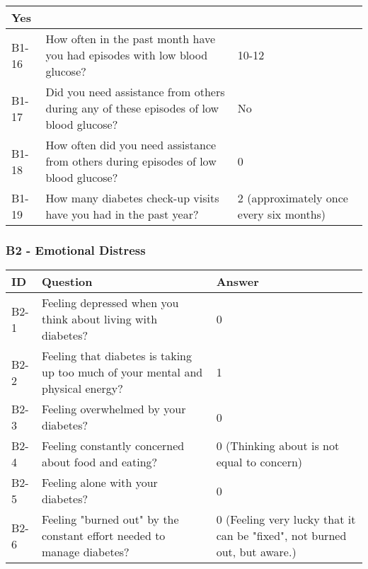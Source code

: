 \begin{table}[H]
\begin{tabularx}{\textwidth}{|l|X|l|}
        Yes  
        \\ \hline
        B1-16 & How often in the past month have you had episodes with low blood glucose? & 
        10-12 
        \\ \hline
        B1-17 & Did you need assistance from others during any of these episodes of low blood glucose? & 
        No  
        \\ \hline
        B1-18 & How often did you need assistance from others during episodes of low blood glucose? & 
        0 
        \\ \hline
        B1-19 & How many diabetes check-up visits have you had in the past year? & 
        2 (approximately once every six months) 
        \\ \hline
    \end{tabularx}
\end{table}

\subsubsection{B2 - Emotional Distress}\label{sec:B2-emotional-distress-answers}
\begin{table}[H]
    \centering
    \renewcommand{\arraystretch}{1.2}
    \begin{tabularx}{\textwidth}{|l|X|l|}
        \hline
        \textbf{ID} & \textbf{Question} & \textbf{Answer} \\ \hline
        B2-1 & Feeling depressed when you think about living with diabetes? & 
        0  
        \\ \hline
        B2-2 & Feeling that diabetes is taking up too much of your mental and physical energy? & 
        1  
        \\ \hline
        B2-3 & Feeling overwhelmed by your diabetes? & 
        0  
        \\ \hline
        B2-4 & Feeling constantly concerned about food and eating? & 
        0 (Thinking about is not equal to concern)  
        \\ \hline
        B2-5 & Feeling alone with your diabetes? & 
        0  
        \\ \hline
        B2-6 & Feeling "burned out" by the constant effort needed to manage diabetes? & 
        0 (Feeling very lucky that it can be "fixed", not burned out, but aware.)  
        \\ \hline
    \end{tabularx}
\end{table}

